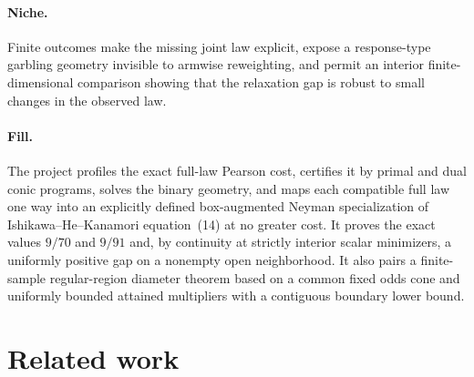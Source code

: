 \documentclass{article}
\begin{document}
\paragraph{Niche.} Finite outcomes make the missing joint law explicit, expose a response-type garbling geometry invisible to armwise reweighting, and permit an interior finite-dimensional comparison showing that the relaxation gap is robust to small changes in the observed law.

\paragraph{Fill.} The project profiles the exact full-law Pearson cost, certifies it by primal and dual conic programs, solves the binary geometry, and maps each compatible full law one way into an explicitly defined box-augmented Neyman specialization of Ishikawa--He--Kanamori equation~(14) at no greater cost. It proves the exact values \(9/70\) and \(9/91\) and, by continuity at strictly interior scalar minimizers, a uniformly positive gap on a nonempty open neighborhood. It also pairs a finite-sample regular-region diameter theorem based on a common fixed odds cone and uniformly bounded attained multipliers with a contiguous boundary lower bound.

\section{Related work}
\end{document}
